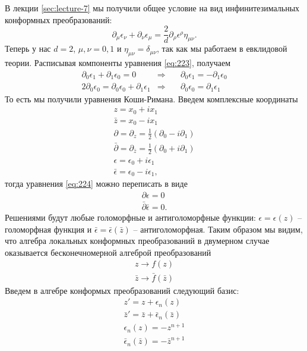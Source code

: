 \documentclass[a4paper,12pt]{article}
\theoremstyle{definition}
\theoremstyle{definition}
\theoremstyle{definition}
\begin{document}
В лекции \ref{sec:lecture-7} мы получили общее условие на вид инфинитезимальных конформных преобразований:
\begin{equation}
  \label{eq:223}
  \partial_{\mu}\epsilon_{\nu}+\partial_{\nu}\epsilon_{\mu}=\frac{2}{d} \partial_{\rho}\epsilon^{\rho} \eta_{\mu\nu}.
\end{equation}
Теперь у нас $d=2$, $\mu,\nu=0,1$ и $\eta_{\mu\nu}=\delta_{\mu\nu}$, так как мы работаем в евклидовой теории. Расписывая компоненты уравнения \eqref{eq:223}, получаем
\begin{eqnarray}
  \label{eq:224}
  \partial_{0} \epsilon_{1}+ \partial_{1}\epsilon_{0}=0& \Rightarrow & \quad\partial_{0} \epsilon_{1}=- \partial_{1}\epsilon_{0}\\
  2\partial_{0}\epsilon_{0}=\partial_{0}\epsilon_{0}+\partial_{1}\epsilon_{1}& \Rightarrow& \quad \partial_{0} \epsilon_{0}= \partial_{1}\epsilon_{1}
\end{eqnarray}
То есть мы получили уравнения Коши-Римана. Введем комплексные координаты
\begin{eqnarray}
  \label{eq:225}
  z=x_{0}+i x_{1}\\
  \bar z = x_{0}-i x_{1}\\
  \partial = \partial_{z}=\frac{1}{2}(\partial_{0}-i\partial_{1}) \\
  \bar \partial=\partial_{\bar z}=\frac{1}{2} (\partial_{0}+i \partial_{1})\\
  \epsilon=\epsilon_{0}+i \epsilon_{1}\\
  \bar \epsilon=\epsilon_{0}-i \epsilon_{1}, 
\end{eqnarray}
тогда уравнения \eqref{eq:224} можно переписать в виде
\begin{eqnarray}
  \label{eq:226}
  \partial \epsilon=0\\
  \bar \partial \bar \epsilon=0.
\end{eqnarray}
Решениями будут любые голоморфные и антиголоморфные функции: $\epsilon=\epsilon(z)$ -- голоморфная функция и $\bar \epsilon=\bar \epsilon(\bar z)$ -- антиголоморфная. Таким образом мы видим, что алгебра локальных конформных преобразований в двумерном случае оказывается бесконечномерной алгеброй преобразований
\begin{eqnarray}
  \label{eq:227}
  z\to f(z)\\
  \bar z \to \bar f(\bar z)
\end{eqnarray}
Введем в алгебре конформых преобразований следующий базис:
\begin{eqnarray}
  \label{eq:228}
  z'=z+\epsilon_{n}(z)\\
  \bar z'=\bar z+\bar \epsilon_{n}(\bar z)\\
  \epsilon_{n}(z)= -z^{n+1}\\
  \bar \epsilon_{n}(\bar z)=-\bar z^{n+1}
\end{eqnarray}
\end{document}
